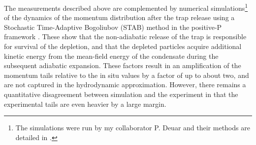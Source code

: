 	The measurements described above are complemented by numerical simulations\footnote{ The simulations were run by my collaborator P. Deuar and their methods are detailed in \cite{Ross21}.} of the dynamics of the momentum distribution after the trap release using a Stochastic Time-Adaptive Bogoliubov (STAB) method in the positive-P framework  \cite{Deuar11,Kheruntsyan12}. 
	These show that the non-adiabatic release of the trap is responsible for survival of the depletion, and that the depleted particles acquire additional kinetic energy from the mean-field energy of the condensate during the subsequent adiabatic expansion. 
	These factors result in an amplification of the momentum tails relative to the in situ values {by a factor of up to about two}, and are not captured in the hydrodynamic approximation. 
	However, there remains a quantitative disagreement between simulation and the experiment {in that the experimental tails are even heavier by a large margin.}

